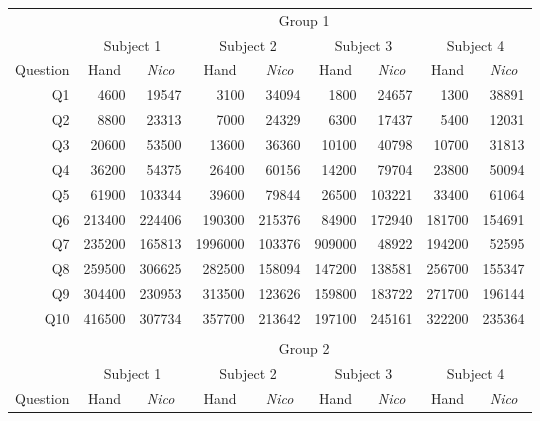 \documentclass[12pt,twoside,notitlepage,xetex]{report}
\begin{document}
\begin{center}
\begin{table}[H]
\begin{center}
\begin{tabular}{|r||r|r||r|r||r|r||r|r|}
\cline{2-9}
\multicolumn{1}{c|}{} & \multicolumn{8}{c|}{Group 1}\\ \cline{2-9}
\multicolumn{1}{c|}{} & \multicolumn{2}{c||}{Subject 1} & \multicolumn{2}{c||}{Subject 2} & \multicolumn{2}{c||}{Subject 3} & \multicolumn{2}{c|}{Subject 4}\\ \hline
\multicolumn{1}{|c||}{Question} & \multicolumn{1}{c|}{Hand} & \multicolumn{1}{c||}{\emph{Nico}} & \multicolumn{1}{c|}{Hand} & \multicolumn{1}{c||}{\emph{Nico}} & \multicolumn{1}{c|}{Hand} & \multicolumn{1}{c||}{\emph{Nico}} & \multicolumn{1}{c|}{Hand} & \multicolumn{1}{c|}{\emph{Nico}}\\ \hline \hline
Q1 & 4600 & 19547 & 3100 & 34094 & 1800 & 24657 & 1300 & 38891\\ \hline
Q2 & 8800 & 23313 & 7000 & 24329 & 6300 & 17437 & 5400 & 12031\\ \hline
Q3 & 20600 & 53500 & 13600 & 36360 & 10100 & 40798 & 10700 & 31813\\ \hline
Q4 & 36200 & 54375 & 26400 & 60156 & 14200 & 79704 & 23800 & 50094\\ \hline
Q5 & 61900 & 103344 & 39600 & 79844 & 26500 & 103221 & 33400 & 61064\\ \hline
Q6 & 213400 & 224406 & 190300 & 215376 & 84900 & 172940 & 181700 & 154691\\ \hline
Q7 & 235200 & 165813 & 1996000 & 103376 & 909000 & 48922 & 194200 & 52595\\ \hline
Q8 & 259500 & 306625 & 282500 & 158094 & 147200 & 138581 & 256700 & 155347\\ \hline
Q9 & 304400 & 230953 & 313500 & 123626 & 159800 & 183722 & 271700 & 196144\\ \hline
Q10 & 416500 & 307734 & 357700 & 213642 & 197100 & 245161 & 322200 & 235364\\ \hline
\multicolumn{9}{c}{}\\ \cline{2-9}
\multicolumn{1}{c|}{} & \multicolumn{8}{c|}{Group 2}\\ \cline{2-9}
\multicolumn{1}{c|}{} & \multicolumn{2}{c||}{Subject 1} & \multicolumn{2}{c||}{Subject 2} & \multicolumn{2}{c||}{Subject 3} & \multicolumn{2}{c|}{Subject 4}\\ \hline
\multicolumn{1}{|c||}{Question} & \multicolumn{1}{c|}{Hand} & \multicolumn{1}{c||}{\emph{Nico}} & \multicolumn{1}{c|}{Hand} & \multicolumn{1}{c||}{\emph{Nico}} & \multicolumn{1}{c|}{Hand} & \multicolumn{1}{c||}{\emph{Nico}} & \multicolumn{1}{c|}{Hand} & \multicolumn{1}{c|}{\emph{Nico}}\\ \hline \hline

\end{tabular}
\end{center}
\end{table}
\end{center}
\end{document}
